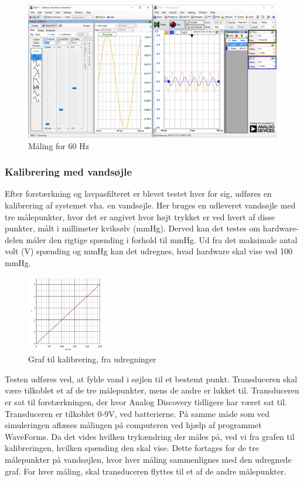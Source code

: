 \begin{figure}[H]
	\centering
	\includegraphics[width=1.0\textwidth]{Figurer/60Hz}
	\caption{Måling for 60 Hz}
	\label{fig:maeling60Hz}
\end{figure}

\subsubsection{Kalibrering med vandsøjle}
Efter forstærkning og lavpasfilteret er blevet testet hver for sig, udføres en kalibrering af systemet vha. en vandsøjle. Her bruges en udleveret vandsøjle med tre målepunkter, hvor det er angivet hvor højt trykket er ved hvert af disse punkter, målt i millimeter kviksølv (mmHg). Derved kan det testes om hardware-delen måler den rigtige spænding i forhold til mmHg. Ud fra det maksimale antal volt (V) spænding og mmHg kan det udregnes, hvad hardware skal vise ved 100 mmHg. 
\begin{figure}[H]
	\centering
	\includegraphics[width=0.3\textwidth]{Figurer/graf_vandtest}
	\caption{Graf til kalibrering, fra udregninger}
	\label{fig:graf_vandtest}
\end{figure}

Testen udføres ved, at fylde vand i søjlen til et bestemt punkt. Transduceren skal være tilkoblet et af de tre målepunkter, mens de andre er lukket til. Transduceren er sat til forstærkningen, der hvor Analog Discovery tidligere har været sat til. Transduceren er tilkoblet 0-9V, ved batterierne. På samme måde som ved simuleringen aflæses målingen på computeren ved hjælp af programmet WaveForms. Da det vides hvilken trykændring der måles på, ved vi fra grafen til kalibreringen, hvilken spænding den skal vise. Dette fortages for de tre målepunkter på vandsøjlen, hvor hver måling sammenlignes med den udregnede graf. For hver måling, skal transduceren flyttes til et af de andre målepunkter.  

